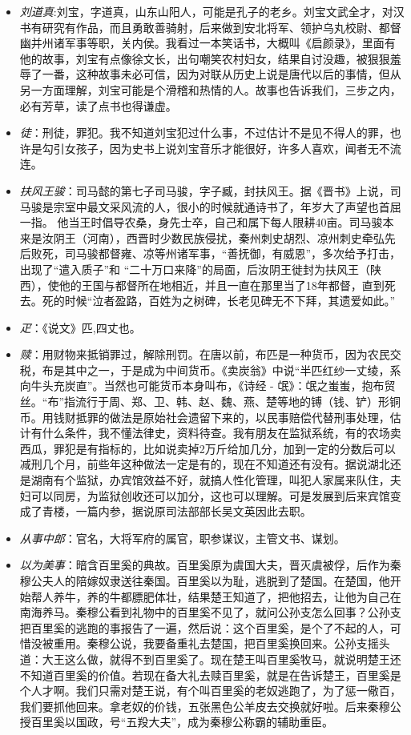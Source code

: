 \documentclass[]{book}
\providecommand{\tightlist}{%
  \setlength{\itemsep}{0pt}\setlength{\parskip}{0pt}}
\begin{document}
\begin{itemize}
\tightlist
\item
  \emph{刘道真}:刘宝，字道真，山东山阳人，可能是孔子的老乡。刘宝文武全才，对汉书有研究有作品，而且勇敢善骑射，后来做到安北将军、领护乌丸校尉、都督幽并州诸军事等职，关内侯。我看过一本笑话书，大概叫《启颜录》，里面有他的故事，刘宝有点像徐文长，出句嘲笑农村妇女，结果自讨没趣，被狠狠羞辱了一番，这种故事未必可信，因为对联从历史上说是唐代以后的事情，但从另一方面理解，刘宝可能是个滑稽和热情的人。故事也告诉我们，三步之内，必有芳草，读了点书也得谦虚。
\item
  \emph{徒}：刑徒，罪犯。我不知道刘宝犯过什么事，不过估计不是见不得人的罪，也许是勾引女孩子，因为史书上说刘宝音乐才能很好，许多人喜欢，闻者无不流连。
\item
  \emph{扶风王骏}：司马懿的第七子司马骏，字子臧，封扶风王。据《晋书》上说，司马骏是宗室中最文采风流的人，很小的时候就通诗书了，年岁大了声望也首屈一指。
  他当王时倡导农桑，身先士卒，自己和属下每人限耕40亩。司马骏本来是汝阴王（河南），西晋时少数民族侵扰，秦州刺史胡烈、凉州刺史牵弘先后败死，司马骏都督雍、凉等州诸军事，``善抚御，有威恩''，多次给予打击，出现了``遣入质子''和
  ``二十万口来降''的局面，后汝阴王徙封为扶风王（陕西），使他的王国与都督所在地相近，并且一直在那里当了18年都督，直到死去。死的时候``泣者盈路，百姓为之树碑，长老见碑无不下拜，其遗爱如此。''
\item
  \emph{疋}：《说文》匹,四丈也。
\item
  \emph{赎}：用财物来抵销罪过，解除刑罚。在唐以前，布匹是一种货币，因为农民交税，布是其中之一，于是成为中间货币。《卖炭翁》中说``半匹红纱一丈绫，系向牛头充炭直''。当然也可能货币本身叫布，《诗经
  -
  氓》：氓之蚩蚩，抱布贸丝。``布''指流行于周、郑、卫、韩、赵、魏、燕、楚等地的镈（钱、铲）形铜币。用钱财抵罪的做法是原始社会遗留下来的，以民事赔偿代替刑事处理，估计有什么条件，我不懂法律史，资料待查。我有朋友在监狱系统，有的农场卖西瓜，罪犯是有指标的，比如说卖掉2万斤给加几分，加到一定的分数后可以减刑几个月，前些年这种做法一定是有的，现在不知道还有没有。据说湖北还是湖南有个监狱，办宾馆效益不好，就搞人性化管理，叫犯人家属来队住，夫妇可以同房，为监狱创收还可以加分，这也可以理解。可是发展到后来宾馆变成了青楼，一篇内参，据说原司法部部长吴文英因此去职。
\item
  \emph{从事中郎}：官名，大将军府的属官，职参谋议，主管文书、谋划。
\item
  \emph{以为美事}：暗含百里奚的典故。百里奚原为虞国大夫，晋灭虞被俘，后作为秦穆公夫人的陪嫁奴隶送往秦国。百里奚以为耻，逃脱到了楚国。在楚国，他开始帮人养牛，养的牛都膘肥体壮，结果楚王知道了，把他招去，让他为自己在南海养马。秦穆公看到礼物中的百里奚不见了，就问公孙支怎么回事？公孙支把百里奚的逃跑的事报告了一遍，然后说：这个百里奚，是个了不起的人，可惜没被重用。秦穆公说，我要备重礼去楚国，把百里奚换回来。公孙支摇头道：大王这么做，就得不到百里奚了。现在楚王叫百里奚牧马，就说明楚王还不知道百里奚的价值。若现在备大礼去赎百里奚，就是在告诉楚王，百里奚是个人才啊。我们只需对楚王说，有个叫百里奚的老奴逃跑了，为了惩一儆百，我们要抓他回来。拿老奴的价钱，五张黑色公羊皮去交换就好啦。后来秦穆公授百里奚以国政，号``五羖大夫''，成为秦穆公称霸的辅助重臣。
\end{itemize}
\end{document}
